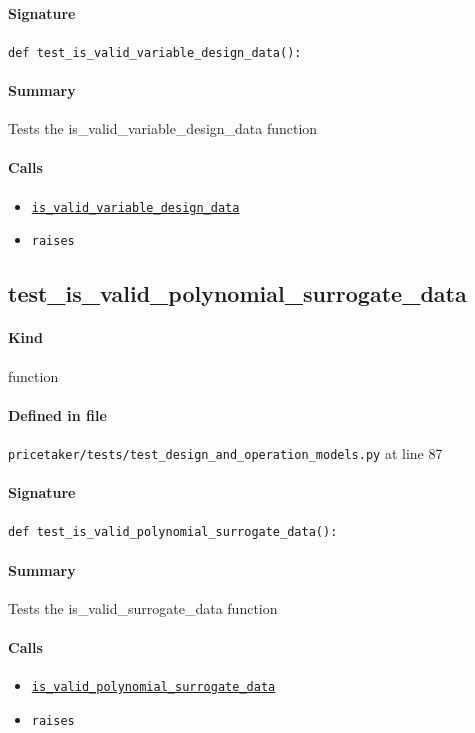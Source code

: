 \documentclass[11pt]{report}
\begin{document}
\paragraph{Signature} \texttt{def test\_is\_valid\_variable\_design\_data():}
\paragraph{Summary} Tests the is\_valid\_variable\_design\_data function
\paragraph{Calls}
\begin{itemize}[leftmargin=*]
  \item \hyperref[def:pricetaker-design_and_operation_models.py:is_valid_variable_design_data:L48]{\texttt{is\_valid\_variable\_design\_data}}
  \item \texttt{raises}
\end{itemize}
\subsection{test\_is\_valid\_polynomial\_surrogate\_data}
\label{def:pricetaker-tests-test_design_and_operation_models.py:test_is_valid_polynomial_surrogate_data:L87}
\paragraph{Kind} function
\paragraph{Defined in file} \texttt{pricetaker/tests/test\_design\_and\_operation\_models.py} at line 87
\paragraph{Signature} \texttt{def test\_is\_valid\_polynomial\_surrogate\_data():}
\paragraph{Summary} Tests the is\_valid\_surrogate\_data function
\paragraph{Calls}
\begin{itemize}[leftmargin=*]
  \item \hyperref[def:pricetaker-design_and_operation_models.py:is_valid_polynomial_surrogate_data:L70]{\texttt{is\_valid\_polynomial\_surrogate\_data}}
  \item \texttt{raises}
\end{itemize}
\end{document}
